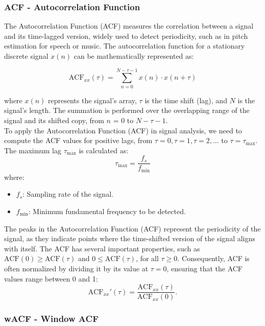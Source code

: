 \documentclass{ieeeaccess}
\begin{document}
\subsubsection{ACF - Autocorrelation Function}
The Autocorrelation Function (ACF) measures the correlation between a signal and its time-lagged version, widely used to detect periodicity, such as in pitch estimation for speech or music. The autocorrelation function for a stationary discrete signal $x(n)$ can be mathematically represented as:

\begin{equation}
\text{ACF}_{xx}(\tau) = \sum_{n=0}^{N-\tau-1} x(n) \cdot x(n+\tau)
\label{eq:acf}
\end{equation}

where $x(n)$ represents the signal's array, $\tau$ is the time shift (lag), and $N$ is the signal's length. The summation is performed over the overlapping range of the signal and its shifted copy, from $n$ = 0 to $N - \tau - 1$.\\
To apply the Autocorrelation Function (ACF) in signal analysis, we need to compute the ACF values for positive lags, from $\tau = 0, \tau = 1, \tau = 2, \dots$ to $\tau = \tau_{\text{max}}$. The maximum lag $\tau_{\text{max}}$ is calculated as:
\begin{equation}
\tau_{\text{max}} = \frac{f_s}{f_{\text{min}}}
\label{eq:max_lag}
\end{equation}
where:
\begin{itemize}
    \item $f_s$: Sampling rate of the signal.
    \item $f_{\text{min}}$: Minimum fundamental frequency to be detected.
\end{itemize}

The peaks in the Autocorrelation Function (ACF) represent the periodicity of the signal, as they indicate points where the time-shifted version of the signal aligns with itself.  
The ACF has several important properties, such as $\text{ACF}(0) \geq \text{ACF}(\tau)$ and $0 \leq \text{ACF}(\tau)$,
for all $\tau \geq 0$. Consequently, ACF is often normalized by dividing it by its value at $\tau = 0$, ensuring that the ACF values range between 0 and 1:
\begin{equation}
\text{ACF}_{xx}'(\tau) = \frac{\text{ACF}_{xx}(\tau)}{\text{ACF}_{xx}(0)}.
\label{eq:normalized_acf}
\end{equation}

\subsubsection{wACF - Window ACF}
\end{document}
